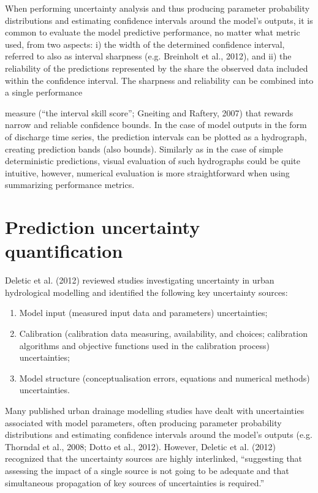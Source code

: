 \documentclass{ctuthesis}\usepackage[]{graphicx}\usepackage[]{color}
\begin{document}
When performing uncertainty analysis and thus producing parameter probability distributions and
estimating confidence intervals around the model’s outputs, it is common to evaluate the model
predictive performance, no matter what metric used, from two aspects: i) the width of the
determined confidence interval, referred to also as interval sharpness (e.g. Breinholt et al., 2012),
and ii) the reliability of the predictions represented by the share the observed data included within
the confidence interval. The sharpness and reliability can be combined into a single performance

measure (“the interval skill score”; Gneiting and Raftery, 2007) that rewards narrow and reliable
confidence bounds. In the case of model outputs in the form of discharge time series, the prediction
intervals can be plotted as a hydrograph, creating prediction bands (also bounds). Similarly as in the
case of simple deterministic predictions, visual evaluation of such hydrographs could be quite
intuitive, however, numerical evaluation is more straightforward when using summarizing
performance metrics.



\section{Prediction uncertainty quantification} \label{PredUncQuant}

Deletic et al. (2012) reviewed studies investigating uncertainty in urban hydrological modelling and identified the following key uncertainty sources:
\begin{enumerate}
        \item Model input (measured input data and parameters) uncertainties;
        \item Calibration (calibration data measuring, availability, and choices; calibration algorithms and objective functions used in the calibration process) uncertainties;
        \item Model structure (conceptualisation errors, equations and numerical methods) uncertainties. 
\end{enumerate}

Many published urban drainage modelling studies have dealt with uncertainties associated with model parameters, often producing parameter probability distributions and estimating confidence intervals around the model’s outputs (e.g. Thorndal et al., 2008; Dotto et al., 2012). However, Deletic et al. (2012) recognized that the uncertainty sources are highly interlinked, “suggesting that assessing the impact of a single source is not going to be adequate and that simultaneous propagation of key sources of uncertainties is required.”
\end{document}
